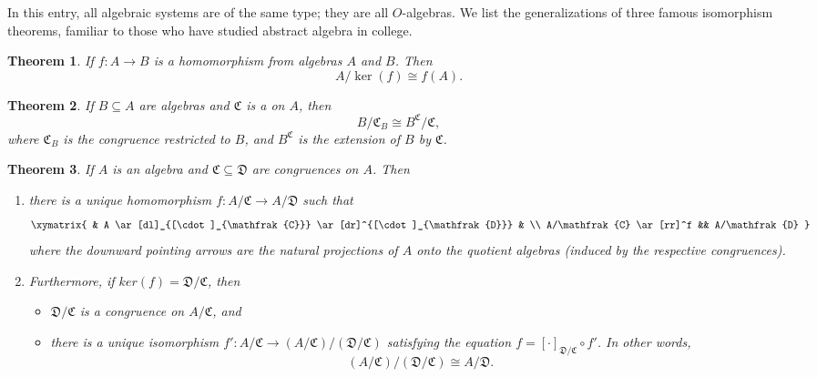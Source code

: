 \documentclass[12pt]{article}
\newtheorem{thm}{Theorem}
\begin{document}
In this entry, all algebraic systems are of the same type; they are all $O$-algebras.  We list the generalizations of three famous isomorphism theorems, familiar to those who have studied abstract algebra in college.

\begin{thm}  If $f:A\to B$ is a homomorphism from algebras $A$ and $B$.  Then $$A/\ker(f)\cong f(A).$$
\end{thm}

\begin{thm}  If $B\subseteq A$ are algebras and $\mathfrak{C}$ is a  on $A$, then $$B/\mathfrak{C}_B\cong B^{\mathfrak{C}}/\mathfrak{C},$$
where $\mathfrak{C}_B$ is the congruence restricted to $B$, and $B^{\mathfrak{C}}$ is the extension of $B$ by $\mathfrak{C}$.
\end{thm}

\begin{thm}  If $A$ is an algebra and $\mathfrak{C}\subseteq \mathfrak{D}$ are congruences on $A$.  Then 
\begin{enumerate}
\item
there is a unique homomorphism $f:A/\mathfrak{C}\to A/\mathfrak{D}$ such that 
$$\xymatrix{
& A \ar[dl]_{[\cdot]_{\mathfrak{C}}} \ar[dr]^{[\cdot]_{\mathfrak{D}}} & \\
A/\mathfrak{C} \ar[rr]^f && A/\mathfrak{D}
}
$$
where the downward pointing arrows are the natural projections of $A$ onto the quotient algebras (induced by the respective congruences).  
\item
Furthermore, if $ker(f)=\mathfrak{D}/\mathfrak{C}$, then 
\begin{itemize}
\item
$\mathfrak{D}/\mathfrak{C}$ is a congruence on $A/\mathfrak{C}$, and 
\item
there is a unique isomorphism $f':A/\mathfrak{C} \to (A/\mathfrak{C})/(\mathfrak{D}/\mathfrak{C})$ satisfying the equation $f=[\cdot]_{\mathfrak{D}/\mathfrak{C}}\circ f'$.  In other words, 
$$(A/\mathfrak{C})/(\mathfrak{D}/\mathfrak{C})\cong A/\mathfrak{D}.$$
\end{itemize}
\end{enumerate}
\end{thm}
\end{document}
